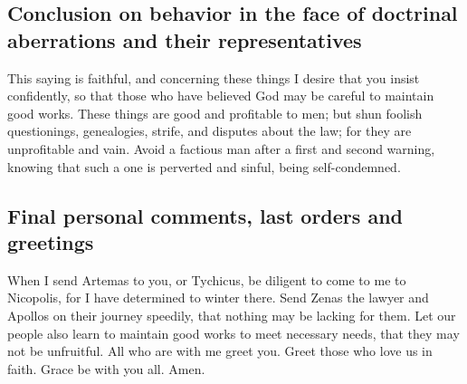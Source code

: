 \hypertarget{conclusion-on-behavior-in-the-face-of-doctrinal-aberrations-and-their-representatives}{%
\subsection{Conclusion on behavior in the face of doctrinal aberrations
and their
representatives}\label{conclusion-on-behavior-in-the-face-of-doctrinal-aberrations-and-their-representatives}}

 This saying is faithful, and concerning these things I
desire that you insist confidently, so that those who have believed God
may be careful to maintain good works. These things are good and
profitable to men;  but shun foolish questionings,
genealogies, strife, and disputes about the law; for they are
unprofitable and vain.  Avoid a factious man after a
first and second warning,  knowing that such a one is
perverted and sinful, being self-condemned.

\hypertarget{final-personal-comments-last-orders-and-greetings}{%
\subsection{Final personal comments, last orders and
greetings}\label{final-personal-comments-last-orders-and-greetings}}

 When I send Artemas to you, or Tychicus, be diligent to
come to me to Nicopolis, for I have determined to winter there.
 Send Zenas the lawyer and Apollos on their journey
speedily, that nothing may be lacking for them.  Let our
people also learn to maintain good works to meet necessary needs, that
they may not be unfruitful.  All who are with me greet
you. Greet those who love us in faith. Grace be with you all. Amen.
